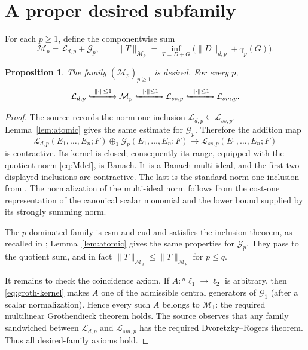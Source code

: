 \documentclass[11pt]{amsart}
\newtheorem{proposition}[theorem]{Proposition}
\newcommand{\Lcal}{\mathcal L}
\newcommand{\Gcal}{\mathcal G}
\newcommand{\Mcal}{\mathcal M}
\begin{document}
\section*{A proper desired subfamily}

For each $p\geq1$, define the componentwise sum
\begin{equation}\label{eq:Mdef}
 \Mcal_p=\Lcal_{d,p}+\Gcal_p,
 \qquad
 \|T\|_{\Mcal_p}
 =\inf_{T=D+G}\bigl(\|D\|_{d,p}+\gamma_p(G)\bigr).
\end{equation}

\begin{proposition}\label{prop:desired}
The family $(\Mcal_p)_{p\geq1}$ is desired.  For every $p$,
\[
 \Lcal_{d,p}\xhookrightarrow{\ \|\cdot\|\leq1\ }\Mcal_p
 \xhookrightarrow{\ \|\cdot\|\leq1\ }\Lcal_{ss,p}
 \xhookrightarrow{\ \|\cdot\|\leq1\ }\Lcal_{sm,p}.
\]
\end{proposition}

\begin{proof}
The source records the norm-one inclusion
$\Lcal_{d,p}\subseteq\Lcal_{ss,p}$.  Lemma~\ref{lem:atomic} gives the same
estimate for $\Gcal_p$.  Therefore the addition map
\[
 \Lcal_{d,p}(E_1,\ldots,E_n;F)\oplus_1
 \Gcal_p(E_1,\ldots,E_n;F)\longrightarrow\Lcal_{ss,p}(E_1,\ldots,E_n;F)
\]
is contractive.  Its kernel is closed; consequently its range, equipped with
the quotient norm \eqref{eq:Mdef}, is Banach.  It is a Banach multi-ideal, and
the first two displayed inclusions are contractive.  The last is the standard
norm-one inclusion from \cite{PS}.  The normalization of the multi-ideal norm
follows from the cost-one representation of the canonical scalar monomial and
the lower bound supplied by its strongly summing norm.

The $p$-dominated family is csm and cud and satisfies the inclusion theorem,
as recalled in \cite{PS}; Lemma~\ref{lem:atomic} gives the same properties for
$\Gcal_p$.  They pass to the quotient sum, and in fact
$\|T\|_{\Mcal_q}\leq\|T\|_{\Mcal_p}$ for $p\leq q$.

It remains to check the coincidence axiom.  If
$A:{}^n\ell_1\to\ell_2$ is arbitrary, then \eqref{eq:groth-kernel} makes
$A$ one of the admissible central generators of $\Gcal_1$ (after a scalar
normalization).  Hence every such $A$ belongs to $\Mcal_1$: the required
multilinear Grothendieck theorem holds.  The source observes that any family
sandwiched between $\Lcal_{d,p}$ and $\Lcal_{sm,p}$ has the required
Dvoretzky--Rogers theorem.  Thus all desired-family axioms hold.
\end{proof}
\end{document}
